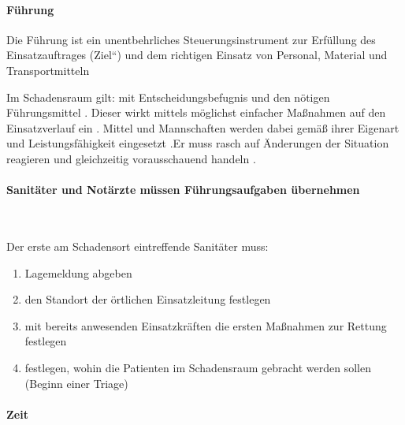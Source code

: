 \paragraph{Führung}

Die Führung ist ein unentbehrliches Steuerungsinstrument zur
Erfüllung des Einsatzauftrages
({\quotedblbase}Ziel{\textquotedblleft}) und dem richtigen Einsatz von
Personal, Material und Transportmitteln 

Im Schadensraum gilt: {\quotedblbase} mit Entscheidungsbefugnis und den
nötigen Führungsmittel . Dieser wirkt mittels möglichst
einfacher Ma{\ss}nahmen 
auf den Einsatzverlauf ein
. Mittel und
Mannschaften werden dabei gemä{\ss} ihrer Eigenart und
Leistungsfähigkeit eingesetzt .Er muss rasch auf \"Anderungen der
Situation reagieren 
und gleichzeitig vorausschauend handeln
.


\paragraph{Sanitäter und Notärzte müssen Führungsaufgaben
übernehmen}~

Der erste am Schadensort eintreffende Sanitäter muss:

\begin{enumerate}
    \item Lagemeldung abgeben
    \item den Standort der örtlichen Einsatzleitung festlegen
    \item mit bereits anwesenden Einsatzkräften die ersten Ma{\ss}nahmen
    zur Rettung festlegen
    \item festlegen, wohin die Patienten im Schadensraum gebracht werden 
    sollen (Beginn einer Triage)
\end{enumerate}

\paragraph{Zeit}


